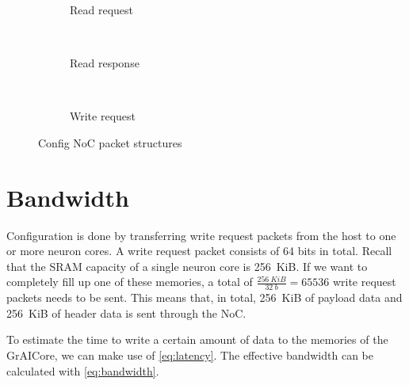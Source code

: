 \hspace*{0.5em}
\begin{figure}[htbp]
    \centering
    \begin{subfigure}[b]{\linewidth}
        \centering
        \begin{adjustbox}{width=0.8\linewidth}
            
        \end{adjustbox}
        \caption{Read request}
        \label{fig:read_request_packet}
    \end{subfigure}
    \\ \vspace{1.5em}
    \begin{subfigure}[b]{\linewidth}
        \centering
        \begin{adjustbox}{width=0.8\linewidth}
            
        \end{adjustbox}
        \caption{Read response}
        \label{fig:read_response_packet}
    \end{subfigure}
    \\ \vspace{1.5em}
    \begin{subfigure}[b]{\linewidth}
        \centering
        \begin{adjustbox}{width=0.8\linewidth}
            
        \end{adjustbox}
        \caption{Write request}
        \label{fig:write_request_packet}
    \end{subfigure}
    \caption{
        Config NoC packet structures
    }
    \label{fig:config_noc_packets}
\end{figure}

\section{Bandwidth}
Configuration is done by transferring write request packets from the host to one or more neuron cores.
A write request packet consists of 64 bits in total.
Recall that the SRAM capacity of a single neuron core is \SI{256}{KiB}.
If we want to completely fill up one of these memories, a total of $\frac{\SI{256}{KiB}}{\SI{32}{b}} = 65536$ write request packets needs to be sent.
This means that, in total, \SI{256}{KiB} of payload data and \SI{256}{KiB} of header data is sent through the NoC.

To estimate the time to write a certain amount of data to the memories of the GrAICore, we can make use of \cref{eq:latency}.
The effective bandwidth can be calculated with \cref{eq:bandwidth}.

